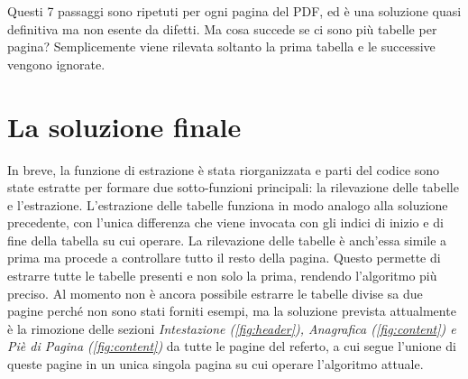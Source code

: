 Questi 7 passaggi sono ripetuti per ogni pagina del PDF, ed è una soluzione quasi definitiva ma non esente da difetti. Ma cosa succede se ci sono più tabelle per pagina? Semplicemente viene rilevata soltanto la prima tabella e le successive vengono ignorate.
\section{La soluzione finale}
In breve, la funzione di estrazione è stata riorganizzata e parti del codice sono state estratte per formare due sotto-funzioni principali: la rilevazione delle tabelle e l'estrazione.
L'estrazione delle tabelle funziona in modo analogo alla soluzione precedente, con l'unica differenza che viene invocata con gli indici di inizio e di fine della tabella su cui operare. La rilevazione delle tabelle è anch'essa simile a prima ma procede a controllare tutto il resto della pagina. Questo permette di estrarre tutte le tabelle presenti e non solo la prima, rendendo l'algoritmo più preciso.
Al momento non è ancora possibile estrarre le tabelle divise sa due pagine perché non sono stati forniti esempi, ma la soluzione prevista attualmente è la rimozione delle sezioni \textit{Intestazione (\ref{fig:header}), Anagrafica (\ref{fig:content}) e Piè di Pagina (\ref{fig:content})} da tutte le pagine del referto, a cui segue l'unione di queste pagine in un unica singola pagina su cui operare l'algoritmo attuale. 





